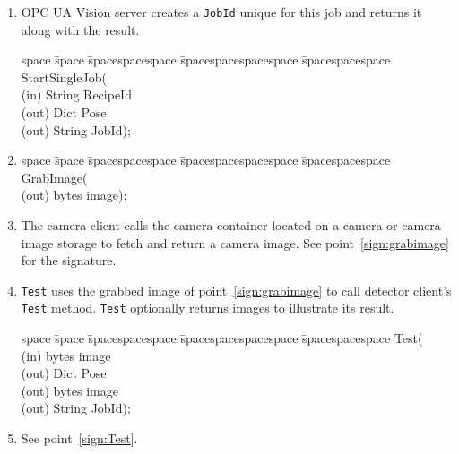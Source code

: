\begin{enumerate}
    \item OPC UA Vision server creates a \texttt{JobId} unique for this job and returns it along with the result.\\
    
    \begin{minipage}{\linewidth}
    \begin{tabbing}
    space \= space \= spacespacespace \= spacespacespacespace \= spacespacespace \kill
    \>  StartSingleJob(\\
    \>  \>  (in)	 \> 	String          \> RecipeId\\
    \>  \>  (out)	 \> 	Dict          \> Pose \\
    \>  \>  (out)	 \> 	String          \> JobId); 
    \end{tabbing}
    \end{minipage}
    \item 
    \begin{tabbing}
    space \= space \= spacespacespace \= spacespacespacespace \= spacespacespace \kill
    \>  GrabImage(\\
    \>  \>  (out)	 \> 	bytes          \> image); 
    \end{tabbing} \label{sign:grabimage}
    \item The camera client calls the camera container located on a camera or camera image storage to fetch and return a camera image. See point~\ref{sign:grabimage} for the signature.
    \item \texttt{Test} uses the grabbed image of point~\ref{sign:grabimage} to call detector client's \texttt{Test} method. \texttt{Test} optionally returns images to illustrate its result. 
    \begin{tabbing}
    space \= space \= spacespacespace \= spacespacespacespace \= spacespacespace \kill
    \>  Test(\\
    \>  \>  (in)	 \> 	bytes          \> image\\
    \>  \>  (out)	 \> 	Dict          \> Pose \\
    \>  \>  (out)	 \> 	bytes          \> image \\
    \>  \>  (out)	 \> 	String          \> JobId); 
    \end{tabbing}\label{sign:Test}
    \item See point~\ref{sign:Test}.
\end{enumerate}

